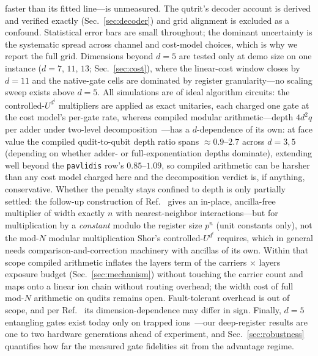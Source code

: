 \documentclass[aps,pra,reprint,superscriptaddress,nofootinbib,floatfix]{revtex4-2}
\begin{document}
faster than its fitted line---is unmeasured. The qutrit's decoder account
is derived and verified exactly (Sec.~\ref{sec:decoder}) and grid
alignment is excluded as a confound. Statistical error
bars are small throughout; the dominant uncertainty is the systematic
spread across channel and cost-model choices, which is why we report
the full grid. Dimensions beyond $d=5$ are tested only at demo size
on one instance ($d=7$, $11$, $13$; Sec.~\ref{sec:cost}), where the
linear-cost window closes by $d=11$ and the native-gate cells are
dominated by register granularity---no scaling sweep exists above
$d=5$. All
simulations are of ideal algorithm circuits: the controlled-$U^{d^i}$
multipliers are applied as exact unitaries, each charged one gate at
the cost model's per-gate rate, whereas compiled modular
arithmetic---depth $4d^2q$ per adder under two-level
decomposition~\cite{pavlidis2021}---has a $d$-dependence of its own:
at face value the compiled qudit-to-qubit depth ratio spans
${\approx}0.9$--$2.7$ across $d=3,5$ (depending on whether adder- or
full-exponentiation depths dominate), extending well beyond the
\texttt{pavlidis} row's $0.85$--$1.09$, so compiled arithmetic can be
harsher than any cost model charged here and the decomposition
verdict is, if anything, conservative. Whether the penalty stays confined to
depth is only partially settled: the follow-up construction of
Ref.~\cite{floratos2024} gives an in-place, ancilla-free multiplier
of width exactly $n$ with nearest-neighbor interactions---but for
multiplication by a \emph{constant} modulo the register size $p^n$
(unit constants only), not the mod-$N$ modular multiplication Shor's
controlled-$U^{d^i}$ requires, which in general needs
comparison-and-correction machinery with ancillas of its own. Within
that scope compiled arithmetic inflates the layers term of the
carriers$\,\times\,$layers exposure budget (Sec.~\ref{sec:mechanism})
without touching the carrier count and maps onto a linear ion chain
without routing overhead; the width cost of full mod-$N$ arithmetic
on qudits remains open.
Fault-tolerant overhead
is out of scope, and per Ref.~\cite{keppens2025} its
dimension-dependence may differ in sign. Finally, $d=5$ entangling
gates exist today only on trapped ions~\cite{hrmo2023}---our
deep-register results are one to two hardware generations ahead of
experiment, and Sec.~\ref{sec:robustness} quantifies how far the
measured gate fidelities sit from the advantage regime.
\end{document}
